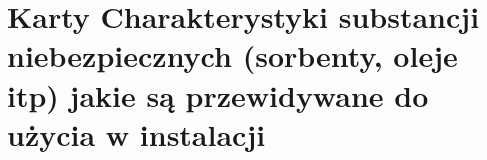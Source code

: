 \section{Karty Charakterystyki substancji niebezpiecznych (sorbenty, oleje
itp) jakie są przewidywane do użycia w instalacji }
